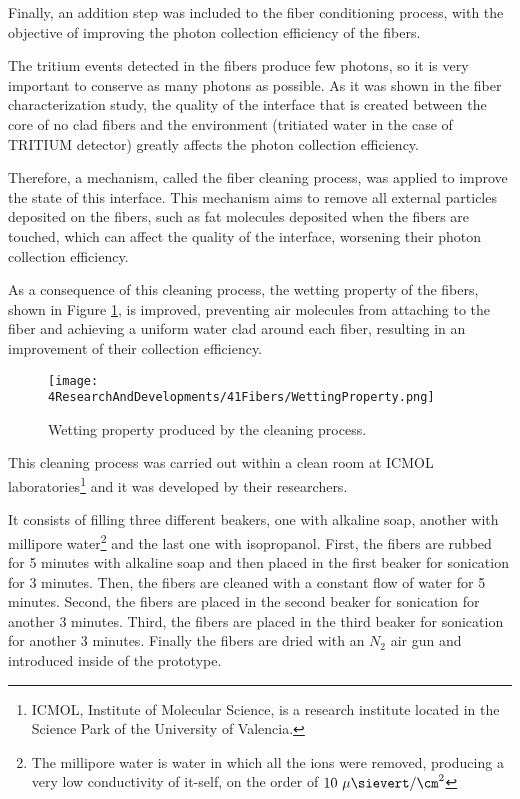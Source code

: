 Finally, an addition step was included to the fiber conditioning process, with the objective of improving the photon collection efficiency of the fibers. 

The tritium events detected in the fibers produce few photons, so it is very important to conserve as many photons as possible. As it was shown in the fiber characterization study, the quality of the interface that is created between the core of no clad fibers and the environment (tritiated water in the case of TRITIUM detector) greatly affects the photon collection efficiency.

Therefore, a mechanism, called the fiber cleaning process, was applied to improve the state of this interface. This mechanism aims to remove all external particles deposited on the fibers, such as fat molecules deposited when the fibers are touched, which can affect the quality of the interface, worsening their photon collection efficiency. 

As a consequence of this cleaning process, the wetting property of the fibers, shown in Figure \ref{fig:WettingProperty}, is improved, preventing air molecules from attaching to the fiber and achieving a uniform water clad around each fiber, resulting in an improvement of their collection efficiency. 


\begin{figure}[h]
\centering
\texttt{[image: 4ResearchAndDevelopments/41Fibers/WettingProperty.png]}
\caption{Wetting property produced by the cleaning process. \cite{WettingProperty}\label{fig:WettingProperty}}
\end{figure}


This cleaning process  was carried out within a clean room at ICMOL laboratories\footnote{ICMOL, Institute of Molecular Science, is a research institute located in the Science Park of the University of Valencia.} and it was developed by their researchers.

It consists of filling three different beakers, one with alkaline soap, another with millipore water\footnote{The millipore water is water in which all the ions were removed, producing a very low conductivity of it-self, on the order of $10~\mu\sievert/\cm^2$} and the last one with isopropanol. First, the fibers are rubbed for 5 minutes with alkaline soap and then placed in the first beaker for sonication for 3 minutes. Then, the fibers are cleaned with a constant flow of water for 5 minutes. Second, the fibers are placed in the second beaker for sonication for another 3 minutes. Third, the fibers are placed in the third beaker for sonication for another 3 minutes. Finally the fibers are dried with an $N_2$ air gun and introduced inside of the prototype.

